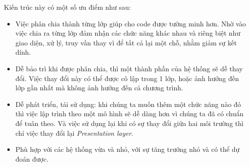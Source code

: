\par
Kiến trúc này có một số ưu điểm như sau:
\begin{itemize}
    \item Việc phân chia thành từng lớp giúp cho code được tường minh hơn. Nhờ vào việc
          chia ra từng lớp đảm nhận các chức năng khác nhau và riêng biệt như giao diện,
          xử lý, truy vấn thay vì để tất cả lại một chỗ, nhằm giảm sự kết dính.
    \item Dễ bảo trì khi được phân chia, thì một thành phần của hệ thống sẽ dễ thay đổi.
          Việc thay đổi này có thể được cô lập trong 1 lớp, hoặc ảnh hưởng đến lớp gần
          nhất mà không ảnh hưởng đến cả chương trình.
    \item Dễ phát triển, tái sử dụng: khi chúng ta muốn thêm một chức năng nào đó thì
          việc lập trình theo một mô hình sẽ dễ dàng hơn vì chúng ta đã có chuẩn để tuân
          theo. Và việc sử dụng lại khi có sự thay đổi giữa hai môi trường thì chỉ việc
          thay đổi lại \emph{Presentation layer}.
      \item Phù hợp với các hệ thống vừa và nhỏ, với sự tăng trưởng nhỏ và có thể dự đoán được.
\end{itemize}


